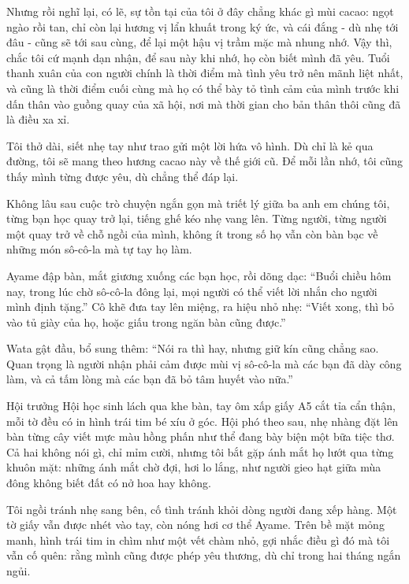 \documentclass[../main.tex]{subfiles}
\begin{document}
Nhưng rồi nghĩ lại, có lẽ, sự tồn tại của tôi ở đây chẳng khác gì mùi cacao: ngọt ngào rồi tan, chỉ còn lại hương vị lẩn khuất trong ký ức, và cái đắng - dù nhẹ tới đâu - cũng sẽ tới sau cùng, để lại một hậu vị trầm mặc mà nhung nhớ. Vậy thì, chắc tôi cứ mạnh dạn nhận, để sau này khi nhớ, họ còn biết mình đã yêu. Tuổi thanh xuân của con người chính là thời điểm mà tình yêu trở nên mãnh liệt nhất, và cũng là thời điểm cuối cùng mà họ có thể bày tỏ tình cảm của mình trước khi dấn thân vào guồng quay của xã hội, nơi mà thời gian cho bản thân thôi cũng đã là điều xa xỉ.

Tôi thở dài, siết nhẹ tay như trao gửi một lời hứa vô hình. Dù chỉ là kẻ qua đường, tôi sẽ mang theo hương cacao này về thế giới cũ. Để mỗi lần nhớ, tôi cũng thấy mình từng được yêu, dù chẳng thể đáp lại.

\ct

Không lâu sau cuộc trò chuyện ngắn gọn mà triết lý giữa ba anh em chúng tôi, từng bạn học quay trở lại, tiếng ghế kéo nhẹ vang lên. Từng người, từng người một quay trở về chỗ ngồi của mình, không ít trong số họ vẫn còn bàn bạc về những món sô-cô-la mà tự tay họ làm.

Ayame đập bàn, mắt giương xuống các bạn học, rồi dõng dạc: ``Buổi chiều hôm nay, trong lúc chờ sô-cô-la đông lại, mọi người có thể viết lời nhắn cho người mình định tặng.'' Cô khẽ đưa tay lên miệng, ra hiệu nhỏ nhẹ: ``Viết xong, thì bỏ vào tủ giày của họ, hoặc giấu trong ngăn bàn cũng được.''

Wata gật đầu, bổ sung thêm: ``Nói ra thì hay, nhưng giữ kín cũng chẳng sao. Quan trọng là người nhận phải cảm được mùi vị sô-cô-la mà các bạn đã dày công làm, và cả tấm lòng mà các bạn đã bỏ tâm huyết vào nữa.''

Hội trưởng Hội học sinh lách qua khe bàn, tay ôm xấp giấy A5 cắt tỉa cẩn thận, mỗi tờ đều có in hình trái tim bé xíu ở góc. Hội phó theo sau, nhẹ nhàng đặt lên bàn từng cây viết mực màu hồng phấn như thể đang bày biện một bữa tiệc thơ. Cả hai không nói gì, chỉ mỉm cười, nhưng tôi bắt gặp ánh mắt họ lướt qua từng khuôn mặt: những ánh mắt chờ đợi, hơi lo lắng, như người gieo hạt giữa mùa đông không biết đất có nở hoa hay không.

Tôi ngồi tránh nhẹ sang bên, cố tình tránh khỏi dòng người đang xếp hàng. Một tờ giấy vẫn được nhét vào tay, còn nóng hơi cơ thể Ayame. Trên bề mặt mỏng manh, hình trái tim in chìm như một vết chàm nhỏ, gợi nhắc điều gì đó mà tôi vẫn cố quên: rằng mình cũng được phép yêu thương, dù chỉ trong hai tháng ngắn ngủi.
\end{document}
